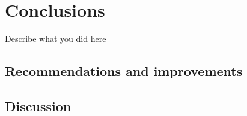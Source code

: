 \chapter{Conclusions}
\label{cha:conclusion}

Describe what you did here




% 

\section{Recommendations and improvements}

\section{Discussion}